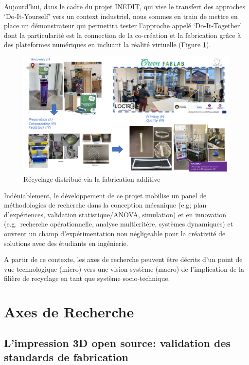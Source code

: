 \documentclass[
  12pt,
  oneside]{book}
\begin{document}
Aujourd'hui, dans le cadre du projet INEDIT, qui vise le transfert des approches `Do-It-Yourself' vers un context industriel, nous sommes en train de mettre en place un démonstrateur qui permettra tester l'approche appelé `Do-It-Together' dont la particularité est la connection de la co-création et la fabrication grâce à des plateformes numériques en incluant la réalité virtuelle (Figure \ref{fig:DRAM-INEDIT}).

\begin{figure}

{\centering \includegraphics[width=1\linewidth]{Figures/INEDIT} 

}

\caption{Récyclage distribué via la fabrication additive}\label{fig:DRAM-INEDIT}
\end{figure}

Indéniablement, le développement de ce projet mobilise un panel de méthodologies de recherche dans la conception mécanique (e.g; plan d'expériences, validation statistique/ANOVA, simulation) et en innovation (e.g.~recherche opérationnelle, analyse multicritère, systèmes dynamiques) et ouvrent un champ d'expérimentation non négligeable pour la créativité de solutions avec des étudiants en ingénierie.

A partir de ce contexte, les axes de recherche peuvent être décrits d'un point de vue technologique (micro) vers une vision système (macro) de l'implication de la filière de recyclage en tant que système socio-technique.

\hypertarget{axes-de-recherche}{%
\section{Axes de Recherche}\label{axes-de-recherche}}

\hypertarget{limpression-3d-open-source-validation-des-standards-de-fabrication}{%
\subsection{L'impression 3D open source: validation des standards de fabrication}\label{limpression-3d-open-source-validation-des-standards-de-fabrication}}
\end{document}
